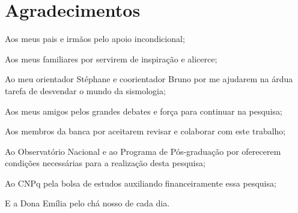 \chapter*{Agradecimentos}

Aos meus pais e irmãos pelo apoio incondicional;

Aos meus familiares por servirem de inspiração e alicerce;

Ao meu orientador Stéphane e coorientador Bruno por me ajudarem na árdua tarefa de desvendar o mundo da sismologia;

Aos meus amigos pelos grandes debates e força para continuar na pesquisa;

Aos membros da banca por aceitarem revisar e colaborar com este trabalho;

Ao Observatório Nacional e ao Programa de Pós-graduação por oferecerem condições necessárias para a realização desta pesquisa;

Ao CNPq pela bolsa de estudos auxiliando financeiramente essa pesquisa;

E a Dona Emília pelo chá nosso de cada dia. 